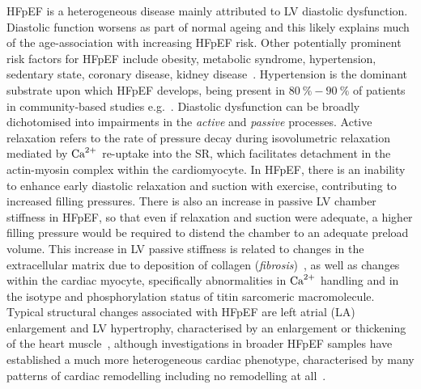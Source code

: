 \vspace{0.2cm}
HFpEF is a heterogeneous disease mainly attributed to LV diastolic dysfunction. Diastolic function worsens as part of normal ageing \cite{Andersen:2014} and this likely explains much of the age-association with increasing HFpEF risk. Other potentially prominent risk factors for HFpEF include obesity, metabolic syndrome, hypertension, sedentary state, coronary disease, kidney disease~\cite{Pfeffer:2019}. Hypertension is the dominant substrate upon which HFpEF develops, being present in $\SI{80}{\percent}-\SI{90}{\percent}$ of patients in community-based studies e.g.~\cite{Borlaug:2009}. Diastolic dysfunction can be broadly dichotomised into impairments in the \textit{active} and \textit{passive} processes. Active relaxation refers to the rate of pressure decay during isovolumetric relaxation mediated by $\textrm{Ca}^{2+}$ re-uptake into the SR, which facilitates detachment in the actin-myosin complex within the cardiomyocyte. In HFpEF, there is an inability to enhance early diastolic relaxation and suction with exercise, contributing to increased filling pressures. There is also an increase in passive LV chamber stiffness in HFpEF, so that even if relaxation and suction were adequate, a higher filling pressure would be required to distend the chamber to an adequate preload volume. This increase in LV passive stiffness is related to changes in the extracellular matrix due to deposition of collagen (\textit{fibrosis})~\cite{Burlew:2002}, as well as changes within the cardiac myocyte, specifically abnormalities in $\textrm{Ca}^{2+}$ handling and in the isotype and phosphorylation status of titin sarcomeric macromolecule. Typical structural changes associated with HFpEF are left atrial (LA) enlargement and LV hypertrophy, characterised by an enlargement or thickening of the heart muscle~\cite{Zile:2004}, although investigations in broader HFpEF samples have established a much more heterogeneous cardiac phenotype, characterised by many patterns of cardiac remodelling including no remodelling at all~\cite{Shah:2012}.


%
%
%
